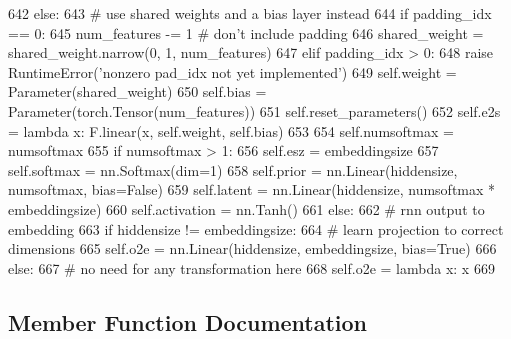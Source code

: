 \begin{DoxyCode}
642         \textcolor{keywordflow}{else}:
643             \textcolor{comment}{# use shared weights and a bias layer instead}
644             \textcolor{keywordflow}{if} padding\_idx == 0:
645                 num\_features -= 1  \textcolor{comment}{# don't include padding}
646                 shared\_weight = shared\_weight.narrow(0, 1, num\_features)
647             \textcolor{keywordflow}{elif} padding\_idx > 0:
648                 \textcolor{keywordflow}{raise} RuntimeError(\textcolor{stringliteral}{'nonzero pad\_idx not yet implemented'})
649             self.weight = Parameter(shared\_weight)
650             self.bias = Parameter(torch.Tensor(num\_features))
651             self.reset\_parameters()
652             self.e2s = \textcolor{keyword}{lambda} x: F.linear(x, self.weight, self.bias)
653 
654         self.numsoftmax = numsoftmax
655         \textcolor{keywordflow}{if} numsoftmax > 1:
656             self.esz = embeddingsize
657             self.softmax = nn.Softmax(dim=1)
658             self.prior = nn.Linear(hiddensize, numsoftmax, bias=\textcolor{keyword}{False})
659             self.latent = nn.Linear(hiddensize, numsoftmax * embeddingsize)
660             self.activation = nn.Tanh()
661         \textcolor{keywordflow}{else}:
662             \textcolor{comment}{# rnn output to embedding}
663             \textcolor{keywordflow}{if} hiddensize != embeddingsize:
664                 \textcolor{comment}{# learn projection to correct dimensions}
665                 self.o2e = nn.Linear(hiddensize, embeddingsize, bias=\textcolor{keyword}{True})
666             \textcolor{keywordflow}{else}:
667                 \textcolor{comment}{# no need for any transformation here}
668                 self.o2e = \textcolor{keyword}{lambda} x: x
669 
\end{DoxyCode}


\subsection{Member Function Documentation}
\mbox{\label{classparlai_1_1agents_1_1legacy__agents_1_1seq2seq_1_1modules__v1_1_1OutputLayer_ad631d05ca77591036d35f3ce70a4fe4f}} 
